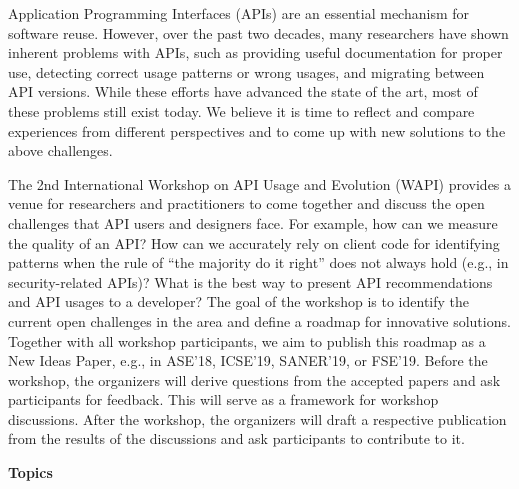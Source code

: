 \documentclass[10pt, conference]{IEEEtran}
\newcommand{\updated}[1]{#1}
\newcommand{\shortname}{WAPI}
\begin{document}
Application Programming Interfaces (APIs) are an essential mechanism for software reuse. However, over the past two decades, many researchers have shown inherent problems with APIs, such as providing useful documentation for proper use, detecting correct usage patterns or wrong usages, and migrating between API versions. While these efforts have advanced the state of the art, most of these problems still exist today. We believe it is time to reflect and compare experiences from different perspectives and to come up with new solutions to the above challenges. 

The 2nd International Workshop on API Usage and Evolution (\shortname{}) provides a venue for researchers and practitioners to come together and discuss the open challenges that API users and designers face. For example, how can we measure the quality of an API\@? How can we accurately rely on client code for identifying patterns when the rule of ``the majority do it right'' does not always hold (e.g., in security-related APIs)? What is the best way to present API recommendations and API usages to a developer?
%
\updated{The goal of the workshop is to identify the current open challenges in the area and define a roadmap for innovative solutions. Together with all workshop participants, we aim to publish this roadmap as a New Ideas Paper, e.g., in ASE'18, ICSE'19, SANER'19, or FSE'19.
Before the workshop, the organizers will derive questions from the accepted papers and ask participants for feedback. This will serve as a framework for workshop discussions. After the workshop, the organizers will draft a respective publication from the results of the discussions and ask participants to contribute to it.}


\vspace{0.2cm}

\noindent
\textbf{\large Topics}
\vspace{0.2cm}
\end{document}
